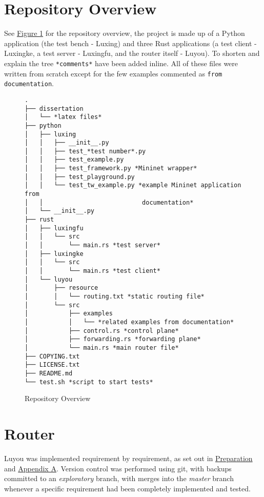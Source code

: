 \documentclass[12pt,a4paper,twoside,openright]{report}
\begin{document}
\section*{Repository Overview}

See \hyperref[fig::repository_overview]{Figure }\ref{fig::repository_overview} for the repository overview, the project is made up of a Python application (the test bench - Luxing) and three Rust applications (a test client - Luxingke, a test server - Luxingfu, and the router itself - Luyou). To shorten and explain the tree \verb!*comments*! have been added inline. All of these files were written from scratch except for the few examples commented as \verb!from documentation!. 

\begin{figure}
\begin{lstlisting}[style=tree]
.
├── dissertation
│   └── *latex files*
├── python
│   ├── luxing
│   │   ├── __init__.py
│   │   ├── test_*test number*.py
│   │   ├── test_example.py
│   │   ├── test_framework.py *Mininet wrapper*
│   │   ├── test_playground.py 
│   │   └── test_tw_example.py *example Mininet application from
│   │                           documentation*
│   └── __init__.py
├── rust
│   ├── luxingfu
│   │   └── src
│   │       └── main.rs *test server*
│   ├── luxingke
│   │   └── src
│   │       └── main.rs *test client*
│   └── luyou
│       ├── resource
│       │   └── routing.txt *static routing file*
│       └── src
│           ├── examples
│           │   └── *related examples from documentation*
│           ├── control.rs *control plane*
│           ├── forwarding.rs *forwarding plane*
│           └── main.rs *main router file*
├── COPYING.txt
├── LICENSE.txt
├── README.md
└── test.sh *script to start tests*
\end{lstlisting}
\caption{Repository Overview}
\label{fig::repository_overview}
\end{figure}

\section{Router}
\label{sec::router}

Luyou was implemented requirement by requirement, as set out in \hyperref[chap::preparation]{Preparation} and \hyperref[appendix::requirements]{Appendix A}.  Version control was performed using git\cite{git}, with backups committed to an \textit{exploratory} branch, with merges into the \textit{master} branch whenever a specific requirement had been completely implemented and tested.
\end{document}
